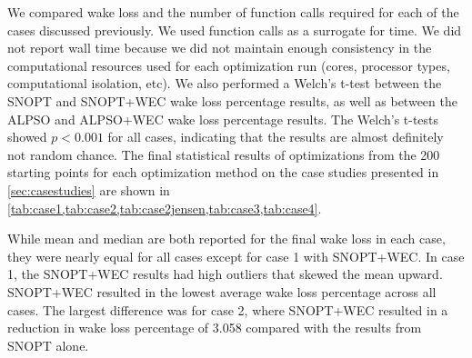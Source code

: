 \documentclass{jpconf}
\begin{document}
We compared wake loss and the number of function calls required for each of the cases discussed previously. We used function calls as a surrogate for time. We did not report wall time because we did not maintain enough consistency in the computational resources used for each optimization run (cores, processor types, computational isolation, etc). We also performed a Welch's t-test between the SNOPT and SNOPT+WEC wake loss percentage results, as well as between the ALPSO and ALPSO+WEC wake loss percentage results. The Welch's t-tests showed $p<0.001$ for all cases, indicating that the results are almost definitely not random chance. The final statistical results of optimizations from the 200 starting points for each optimization method on the case studies presented in \cref{sec:casestudies} are shown in \cref{tab:case1,tab:case2,tab:case2jensen,tab:case3,tab:case4}. 

 While mean and median are both reported for the final wake loss in each case, they were nearly equal for all cases except for case 1 with SNOPT+WEC. In case 1, the SNOPT+WEC results had high outliers that skewed the mean upward. SNOPT+WEC resulted in the lowest average wake loss percentage across all cases. The largest difference was for case 2, where SNOPT+WEC resulted in a reduction in wake loss percentage of 3.058 compared with the results from SNOPT alone.
 
\end{document}
